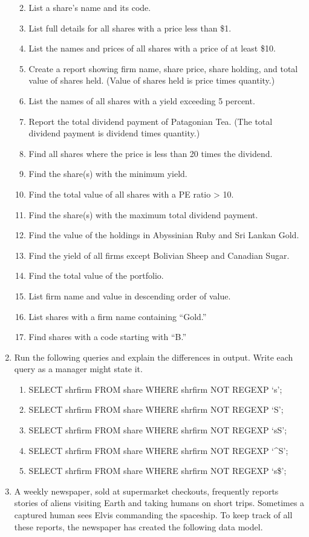 \documentclass[
]{article}
\begin{document}
\begin{enumerate}
  \begin{enumerate}
  \def\labelenumii{\alph{enumii}.}
  \item
    List a share's name and its code.
  \item
    List full details for all shares with a price less than \$1.
  \item
    List the names and prices of all shares with a price of at least \$10.
  \item
    Create a report showing firm name, share price, share holding, and total value of shares held. (Value of shares held is price times quantity.)
  \item
    List the names of all shares with a yield exceeding 5 percent.
  \item
    Report the total dividend payment of Patagonian Tea. (The total dividend payment is dividend times quantity.)
  \item
    Find all shares where the price is less than 20 times the dividend.
  \item
    Find the share(s) with the minimum yield.
  \item
    Find the total value of all shares with a PE ratio \textgreater{} 10.
  \item
    Find the share(s) with the maximum total dividend payment.
  \item
    Find the value of the holdings in Abyssinian Ruby and Sri Lankan Gold.
  \item
    Find the yield of all firms except Bolivian Sheep and Canadian Sugar.
  \item
    Find the total value of the portfolio.
  \item
    List firm name and value in descending order of value.
  \item
    List shares with a firm name containing ``Gold.''
  \item
    Find shares with a code starting with ``B.''
  \end{enumerate}
\item
  Run the following queries and explain the differences in output. Write each query as a manager might state it.

  \begin{enumerate}
  \def\labelenumii{\alph{enumii}.}
  \item
    SELECT shrfirm FROM share WHERE shrfirm NOT REGEXP `s';
  \item
    SELECT shrfirm FROM share WHERE shrfirm NOT REGEXP `S';
  \item
    SELECT shrfirm FROM share WHERE shrfirm NOT REGEXP `s\textbar S';
  \item
    SELECT shrfirm FROM share WHERE shrfirm NOT REGEXP `\^{}S';
  \item
    SELECT shrfirm FROM share WHERE shrfirm NOT REGEXP `s\$';
  \end{enumerate}
\item
  A weekly newspaper, sold at supermarket checkouts, frequently reports stories of aliens visiting Earth and taking humans on short trips. Sometimes a captured human sees Elvis commanding the spaceship. To keep track of all these reports, the newspaper has created the following data model.
\end{enumerate}
\end{document}
